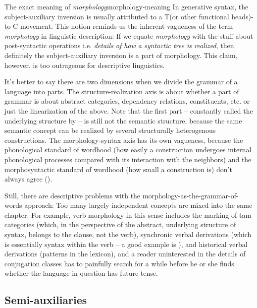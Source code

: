 \documentclass[UTF8, a4paper, oneside, scheme=plain]{ctexrep}
\newcommand*{\term}[1]{\emph{#1}}
\begin{document}
\begin{theorybox}{The exact meaning of \term{morphology}}{morphology-meaning}
    In generative syntax, the subject-auxiliary inversion is usually attributed to 
    a T(or other functional heads)-to-C movement.
    This notion reminds us the inherent vagueness of the term \term{morphology} in linguistic description:
    If we equate \term{morphology} with the stuff about post-syntactic operations 
    i.e. \emph{details of how a syntactic tree is realized},
    then definitely the subject-auxiliary inversion is a part of morphology.
    This claim, however, is too outrageous for descriptive linguistics.

    It's better to say there are two dimensions 
    when we divide the grammar of a language into parts.
    The structure-realization axis is about 
    whether a part of grammar is about abstract categories, dependency relations, constituents, etc. 
    or just the linearization of the above.
    Note that the first part -- constantly called the underlying structure by \citet{dixon2009basic1} 
    -- is still not the semantic structure,
    because the same semantic concept can be realized by several structurally heterogenous constructions.
    The morphology-syntax axis has its own vagueness,
    because the phonological standard of wordhood 
    (how easily a construction undergoes internal phonological processes 
    compared with its interaction with the neighbors)
    and the morphosyntactic standard of wordhood 
    (how small a construction is)
    don't always agree ().

    Still, there are descriptive problems with the morphology-as-the-grammar-of-words approach:
    Too many largely independent concepts are mixed into the same chapter.
    For example, verb morphology in this sense includes 
    the marking of \acs{tam} categories 
    (which, in the perspective of the abstract, underlying structure of syntax, 
    belongs to the clause, not the verb),
    synchronic verbal derivations 
    (which is essentially syntax within the verb -- a good example is \citet{de2019negation}),
    and historical verbal derivations 
    (patterns in the lexicon),
    and a reader uninterested in the details of conjugation classes 
    has to painfully search for a while before he or she finds 
    whether the language in question has future tense.
\end{theorybox}

\subsection{Semi-auxiliaries}\label{sec:semi-auxiliary}
\end{document}
